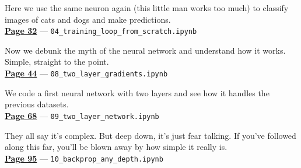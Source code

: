 \documentclass[11pt]{article}
\begin{document}
\vspace{0.7em}

\begin{tcolorbox}[colback=gray!5, colframe=gray!60!black, title=Cat vs Dog, fonttitle=\bfseries]
Here we use the same neuron again (this little man works too much) to classify images of cats and dogs and make predictions.\\
\hyperref[sec:practice_01]{\textbf{Page 32}} — \texttt{04\_training\_loop\_from\_scratch.ipynb}
\end{tcolorbox}

\vspace{0.7em}

\begin{tcolorbox}[colback=gray!5, colframe=gray!60!black, title=Understanding the neural network, fonttitle=\bfseries]
Now we debunk the myth of the neural network and understand how it works. Simple, straight to the point.\\
\hyperref[sec:theory_02]{\textbf{Page 44}} — \texttt{08\_two\_layer\_gradients.ipynb}
\end{tcolorbox}

\vspace{0.7em}

\begin{tcolorbox}[colback=gray!5, colframe=gray!60!black, title=Coding a two-layer neural network, fonttitle=\bfseries]
We code a first neural network with two layers and see how it handles the previous datasets.\\
\hyperref[sec:practice_02]{\textbf{Page 68}} — \texttt{09\_two\_layer\_network.ipynb}
\end{tcolorbox}

\vspace{0.7em}

\begin{tcolorbox}[colback=gray!5, colframe=gray!60!black, title=Coding a multi-layer neural network, fonttitle=\bfseries]
They all say it's complex. But deep down, it's just fear talking. If you've followed along this far, you'll be blown away by how simple it really is.\\
\hyperref[sec:practice_03]{\textbf{Page 95}} — \texttt{10\_backprop\_any\_depth.ipynb}
\end{tcolorbox}










\newpage
\end{document}

